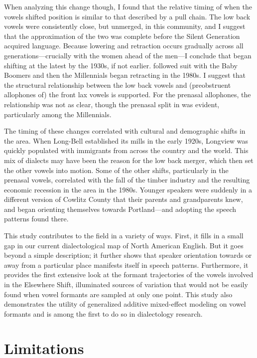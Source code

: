 When analyzing this change though, I found that the relative timing of when the vowels shifted position is similar to that described by a pull chain. The low back vowels were consistently close, but unmerged, in this community, and I suggest that the approximation of the two was complete before the Silent Generation acquired language. Because \bat lowering and retraction occurs gradually across all generations---crucially with the women ahead of the men---I conclude that \bat began shifting at the latest by the 1930s, if not earlier. \bet followed suit with the Baby Boomers and then the Millennials began retracting \bit in the 1980s. I suggest that the structural relationship between the low back vowels and (preobstruent allophones of) the front lax vowels is supported. For the prenasal allophones, the relationship was not as clear, though the prenasal split in \ban was evident, particularly among the Millennials.

The timing of these changes correlated with cultural and demographic shifts in the area. When Long-Bell established its mills in the early 1920s, Longview was quickly populated with immigrants from across the country and the world. This mix of dialects may have been the reason for the low back merger, which then set the other vowels into motion. Some of the other shifts, particularly in the prenasal vowels, correlated with the fall of the timber industry and the resulting economic recession in the area in the 1980s. Younger speakers were suddenly in a different version of Cowlitz County that their parents and grandparents knew, and began orienting themselves towards Portland---and adopting the speech patterns found there.

This study contributes to the field in a variety of ways. First, it fills in a small gap in our current dialectological map of North American English. But it goes beyond a simple description; it further shows that speaker orientation towards or away from a particular place manifests itself in speech patterns. Furthermore, it provides the first extensive look at the formant trajectories of the vowels involved in the Elsewhere Shift, illuminated sources of variation that would not be easily found when vowel formants are sampled at only one point. This study also demonstrates the utility of generalized additive mixed-effect modeling on vowel formants and is among the first to do so in dialectology research.



\section{Limitations}

